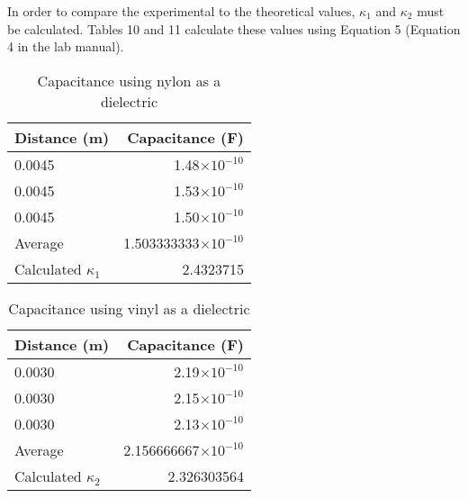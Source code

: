 \documentclass [12pt, letterpaper, twoside] {article}
\begin{document}
\begin{enumerate}
  In order to compare the experimental to the theoretical values, \(\kappa_{1}\) and \(\kappa_{2}\) must be calculated. Tables 10 and 11 calculate these values using Equation 5 (Equation 4 in the lab manual). 

  \begin{table}[h!]
    \centering
    \begin{tabular}{| l | r |}
      \hline\hline
      Distance (m) & Capacitance (F) \\
      \hline
      0.0045 & 1.48\(\times10^{-10}\) \\
      \hline
      0.0045 & 1.53\(\times10^{-10}\) \\
      \hline
      0.0045 & 1.50\(\times10^{-10}\) \\
      \hline
      Average & 1.503333333\(\times10^{-10}\) \\
      \hline
      Calculated \(\kappa_{1}\) & 2.4323715 \\
      \hline\hline
    \end{tabular}
    \caption{Capacitance using nylon as a dielectric}
  \end{table}

  \begin{table}[h!]
    \centering
    \begin{tabular}{| l | r |}
      \hline\hline
      Distance (m) & Capacitance (F) \\
      \hline
      0.0030 & 2.19\(\times10^{-10}\) \\
      \hline
      0.0030 & 2.15\(\times10^{-10}\) \\
      \hline
      0.0030 & 2.13\(\times10^{-10}\) \\
      \hline
      Average & 2.156666667\(\times10^{-10}\) \\
      \hline
      Calculated \(\kappa_{2}\) & 2.326303564 \\
      \hline\hline
    \end{tabular}
    \caption{Capacitance using vinyl as a dielectric}
  \end{table}


\end{enumerate}
\end{document}
